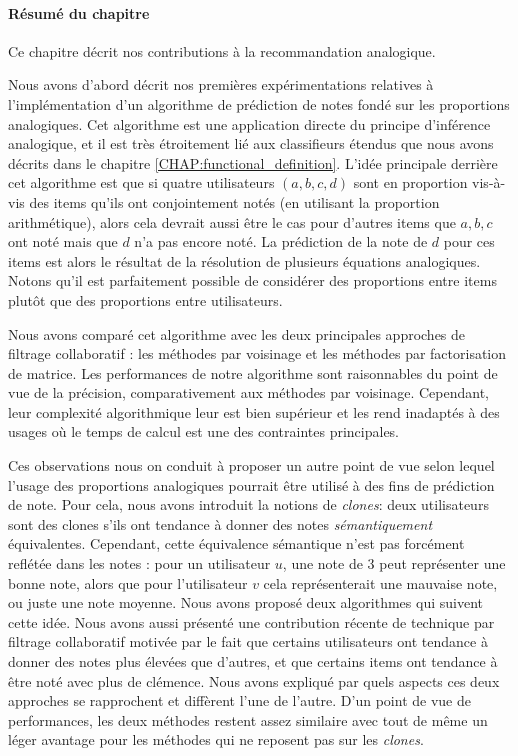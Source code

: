 \paragraph{Résumé du chapitre}

Ce chapitre décrit nos contributions à la recommandation analogique.

Nous avons d'abord décrit nos premières expérimentations relatives  à
l'implémentation d'un algorithme de prédiction de notes fondé sur les
proportions analogiques. Cet algorithme est une application directe du principe
d'inférence analogique, et il est très étroitement lié aux classifieurs étendus
que nous avons décrits dans le chapitre \ref{CHAP:functional_definition}.
L'idée principale derrière cet algorithme est que si quatre utilisateurs $(a,
b, c, d)$ sont en proportion vis-à-vis des items qu'ils ont conjointement notés
(en utilisant la proportion arithmétique), alors cela devrait aussi être le cas
pour d'autres items que $a, b, c$ ont noté mais que $d$ n'a pas encore noté. La
prédiction de la note de $d$ pour ces items est alors le résultat de la
résolution de plusieurs équations analogiques. Notons qu'il est parfaitement
possible de considérer des proportions entre items plutôt que des proportions
entre utilisateurs.

Nous avons comparé cet algorithme avec les deux principales approches de
filtrage collaboratif : les méthodes par voisinage et les méthodes par
factorisation de matrice. Les performances de notre algorithme sont raisonnables
du point de vue de la précision, comparativement aux méthodes par voisinage.
Cependant, leur complexité algorithmique leur est bien supérieur et les rend
inadaptés à des usages où le temps de calcul est une des contraintes
principales.

Ces observations nous on conduit à proposer un autre point de vue selon lequel
l'usage des proportions analogiques pourrait  être utilisé  à des fins de
prédiction de note. Pour cela, nous avons introduit la notions de
\textit{clones}: deux utilisateurs sont des clones s'ils ont tendance à donner
des notes \textit{sémantiquement} équivalentes. Cependant, cette équivalence
sémantique n'est pas forcément reflétée dans les notes : pour un utilisateur
$u$, une note  de $3$ peut représenter une bonne note, alors que pour
l'utilisateur $v$ cela représenterait une mauvaise note, ou juste une note
moyenne. Nous avons proposé deux algorithmes qui suivent cette idée. Nous avons
aussi présenté une contribution récente de technique par filtrage collaboratif
motivée par le fait que certains utilisateurs ont tendance à donner des notes
plus élevées que d'autres, et que certains items ont tendance à être noté avec
plus de clémence. Nous avons expliqué par quels aspects ces deux approches se
rapprochent et diffèrent l'une de l'autre. D'un point de vue de performances,
les deux méthodes restent assez similaire avec tout de même un léger avantage
pour les méthodes qui ne reposent pas sur les \textit{clones}.


